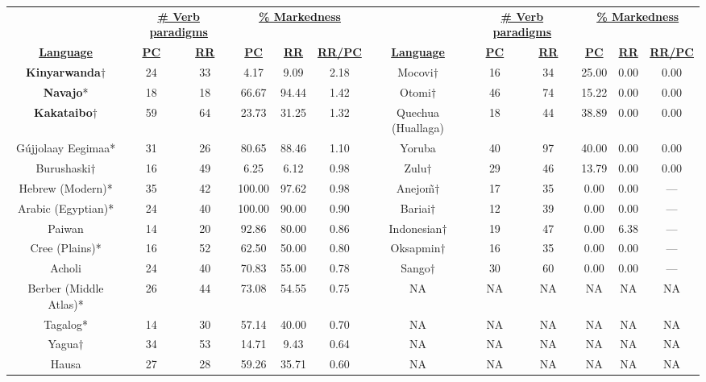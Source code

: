 \begin{tabular}{cccccccccccc}
 & \multicolumn{2}{c}{\underline{\textbf{\# Verb paradigms}}} & \multicolumn{3}{c}{\underline{\textbf{\% Markedness}}} & & \multicolumn{2}{c}{\underline{\textbf{\# Verb paradigms}}} & \multicolumn{3}{c}{\underline{\textbf{\% Markedness}}} \\
\underline{\textbf{Language}} & \underline{\textbf{PC}} & \underline{\textbf{RR}} & \underline{\textbf{PC}} & \underline{\textbf{RR}} & \underline{\textbf{RR/PC}} & \underline{\textbf{Language}} & \underline{\textbf{PC}} & \underline{\textbf{RR}} & \underline{\textbf{PC}} & \underline{\textbf{RR}} & \underline{\textbf{RR/PC}} \\
\textbf{Kinyarwanda}$\dagger$ & 24 & 33 & 4.17 & 9.09 & 2.18 & Mocovi$\dagger$ & 16 & 34 & 25.00 & 0.00 & 0.00 \\
\textbf{Navajo}* & 18 & 18 & 66.67 & 94.44 & 1.42 & Otomi$\dagger$ & 46 & 74 & 15.22 & 0.00 & 0.00 \\
\textbf{Kakataibo}$\dagger$ & 59 & 64 & 23.73 & 31.25 & 1.32 & Quechua (Huallaga) & 18 & 44 & 38.89 & 0.00 & 0.00 \\
Gújjolaay Eegimaa* & 31 & 26 & 80.65 & 88.46 & 1.10 & Yoruba & 40 & 97 & 40.00 & 0.00 & 0.00 \\
Burushaski$\dagger$ & 16 & 49 & 6.25 & 6.12 & 0.98 & Zulu$\dagger$ & 29 & 46 & 13.79 & 0.00 & 0.00 \\
Hebrew (Modern)* & 35 & 42 & 100.00 & 97.62 & 0.98 & Anejo\~{m}$\dagger$ & 17 & 35 & 0.00 & 0.00 & --- \\
Arabic (Egyptian)* & 24 & 40 & 100.00 & 90.00 & 0.90 & Bariai$\dagger$ & 12 & 39 & 0.00 & 0.00 & --- \\
Paiwan & 14 & 20 & 92.86 & 80.00 & 0.86 & Indonesian$\dagger$ & 19 & 47 & 0.00 & 6.38 & --- \\
Cree (Plains)* & 16 & 52 & 62.50 & 50.00 & 0.80 & Oksapmin$\dagger$ & 16 & 35 & 0.00 & 0.00 & --- \\
Acholi & 24 & 40 & 70.83 & 55.00 & 0.78 & Sango$\dagger$ & 30 & 60 & 0.00 & 0.00 & --- \\
Berber (Middle Atlas)* & 26 & 44 & 73.08 & 54.55 & 0.75 & NA & NA & NA & NA & NA & NA \\
Tagalog* & 14 & 30 & 57.14 & 40.00 & 0.70 & NA & NA & NA & NA & NA & NA \\
Yagua$\dagger$ & 34 & 53 & 14.71 & 9.43 & 0.64 & NA & NA & NA & NA & NA & NA \\
Hausa & 27 & 28 & 59.26 & 35.71 & 0.60 & NA & NA & NA & NA & NA & NA \\

\end{tabular}
